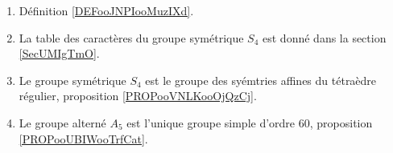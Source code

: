        \label{THEMEooQEEWooXDhvhv}

\begin{enumerate}
    \item
        Définition \ref{DEFooJNPIooMuzIXd}.
    \item
        La table des caractères du groupe symétrique \( S_4\) est donné dans la section \ref{SecUMIgTmO}.
    \item
        Le groupe symétrique \( S_4\) est le groupe des syémtries affines du tétraèdre régulier, proposition \ref{PROPooVNLKooOjQzCj}.
    \item
        Le groupe alterné \( A_5\) est l'unique groupe simple d'ordre \( 60\), proposition \ref{PROPooUBIWooTrfCat}.
\end{enumerate}
